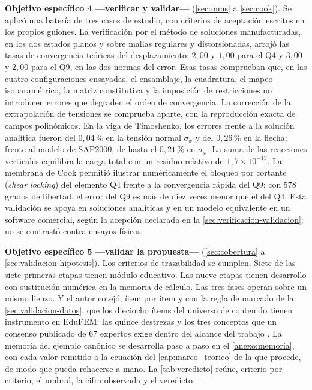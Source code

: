 \textbf{Objetivo específico 4 —verificar y validar—} (\autoref{sec:mms} a \autoref{sec:cook}). Se aplicó una batería de tres casos de estudio, con criterios de aceptación escritos en los propios guiones. La verificación por el método de soluciones manufacturadas, en los dos estados planos y sobre mallas regulares y distorsionadas, arrojó las tasas de convergencia teóricas del desplazamiento: $2{,}00$ y $1{,}00$ para el Q4 y $3{,}00$ y $2{,}00$ para el Q9, en las dos normas del error. Esas tasas comprueban que, en las cuatro configuraciones ensayadas, el ensamblaje, la cuadratura, el mapeo isoparamétrico, la matriz constitutiva y la imposición de restricciones no introducen errores que degraden el orden de convergencia. La corrección de la extrapolación de tensiones se comprueba aparte, con la reproducción exacta de campos polinómicos. En la viga de Timoshenko, los errores frente a la solución analítica fueron del $0{,}04\,\%$ en la tensión normal $\sigma_x$ y del $0{,}26\,\%$ en la flecha; frente al modelo de SAP2000, de hasta el $0{,}21\,\%$ en $\sigma_x$. La suma de las reacciones verticales equilibra la carga total con un residuo relativo de $1{,}7\times10^{-13}$. La membrana de Cook permitió ilustrar numéricamente el bloqueo por cortante (\emph{shear locking}) del elemento Q4 frente a la convergencia rápida del Q9: con 578 grados de libertad, el error del Q9 es más de diez veces menor que el del Q4. Esta validación se apoya en soluciones analíticas y en un modelo equivalente en un software comercial, según la acepción declarada en la \autoref{sec:verificacion-validacion}; no se contrastó contra ensayos físicos.

\textbf{Objetivo específico 5 —validar la propuesta—} (\autoref{sec:cobertura} a \autoref{sec:validacion-hipotesis}). Los criterios de trazabilidad se cumplen. Siete de las siete primeras etapas tienen módulo educativo. Las nueve etapas tienen desarrollo con sustitución numérica en la memoria de cálculo. Las tres fases operan sobre un mismo lienzo. Y el autor cotejó, ítem por ítem y con la regla de marcado de la \autoref{sec:validacion-datos}, que los dieciocho ítems del universo de contenido tienen instrumento en EduFEM: las quince destrezas y los tres conceptos que un consenso publicado de 67 expertos exige dentro del alcance del trabajo \autocite[pp.~1162-1163]{perezsantiago2023fem}. La memoria del ejemplo canónico se desarrolla paso a paso en el \autoref{anexo:memoria}, con cada valor remitido a la ecuación del \autoref{cap:marco_teorico} de la que procede, de modo que pueda rehacerse a mano. La \autoref{tab:veredicto} reúne, criterio por criterio, el umbral, la cifra observada y el veredicto.

